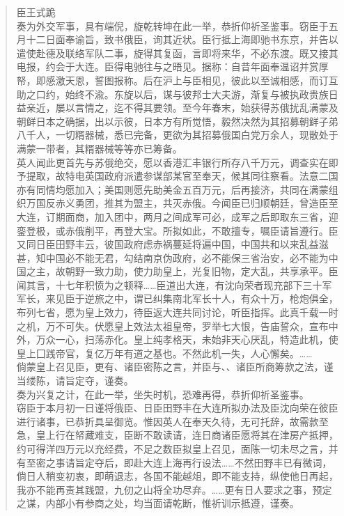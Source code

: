\begin{quote}
	臣王式跪\\

奏为外交军事，具有端倪，旋乾转坤在此一举，恭折仰祈圣鉴事。窃臣于五月十二日面奉谕旨，致书俄臣，询其近状。臣行抵上海即驰书东京，并告以遣使赴德及联络军队二事，旋得其复函，言即将来华，不必东渡。既又接其电报，约会于大连。臣得电驰往与之晤见。据称：自昔年面奉温诏并赏厚帑，即感激天恩，誓图报称。后在沪上与臣相见，彼此以至诚相感，而订互助之口约，始终不渝。东旋以后，谋与彼邦士大夫游，渐复与被执政贵族日益亲近，屡以言情之，迄不得其要领。至今年春末，始获得苏俄扰乱满蒙及朝鲜日本之确据，出以示彼，日本方有所觉悟，毅然决然为其招募朝鲜子弟八千人，一切糈器械，悉已完备，更欲为其招募俄国白党万余人，现散处于满蒙一带者，其糈器械等等亦已筹备。\\

英人闻此更首先与苏俄绝交，愿以香港汇丰银行所存八千万元，调查实在即予提取，故特电英国政府派遣参谋部某官至奉天，候其同往察看。法意二国亦有同情均愿加入；美国则愿先助美金五百万元，后再接济，共同在满蒙组织万国反赤义勇团，推其为盟主，共灭赤俄。今闻臣已归顺朝廷，曾造臣至大连，订期面商，加入团中，两月之间成军可必，成军之后即取东三省，迎銮登极，或赤俄削平，再登大宝。所拟如此，不敢擅专，嘱臣请旨遵行。臣又同日臣田野丰云，彼国政府虑赤祸蔓延将遍中国，中国共和以来乱益滋甚，知中国必不能无君，勾结南京伪政府，必不能保三省治安，必不能为中国之主，故朝野一致力助，使力助皇上，光复旧物，定大乱，共享承平。臣闻其言，十七年积愤为之顿释……臣道出大连，有沈向荣者现充部下三十军军长，来见臣于逆旅之中，谓已纠集南北军长十人，有众十万，枪炮俱全，布列七省，愿为皇上效力，待臣返大连共同讨论，听臣指挥。此真千载一时之机，万不可失。伏愿皇上效法太祖皇帝，罗举七大恨，告庙誓众，宣布中外，万众一心，扫荡赤化。皇上纯孝格天，未始非天心厌乱，特造此机，使皇上囗践帝官，复亿万年有道之基也。不然此机一失，人心懈矣。……\\

倘蒙皇上召见臣，更有、诸臣密陈之言，并臣与、、诸臣所商筹款之法，谨当缕陈，请旨定夺，谨奏。\\

奏为兴复之计，在此一举，坐失时机，恐难再得，恭折仰祈圣鉴事。\\

窃臣于本月初一日谨将俄臣、日臣田野丰在大连所拟办法及臣沈向荣在彼臣进行诸事，已恭折具呈御览。惟因英人在奉天久待，无可托辞，故需款至急，皇上行在帑藏难支，臣断不敢读请，连日商诸臣愿将其在津房产抵押，约可得洋四万元以充经费，不足之数臣拟皇上召见，面陈一切未尽之言，并有至密之事请旨定夺后，即赴大连上海再行设法……不然田野丰已有微词，倘日人稍变初衷，即萌退志，各国不能越俎，即不能支持，纵使他日再起，我亦不能再责其践盟，九仞之山将全功尽弃。……更有日人要求之事，预定之谋，内部小有参商之处，均当面请乾断，惟祈训示抵遵，谨奏。\\


\end{quote}
